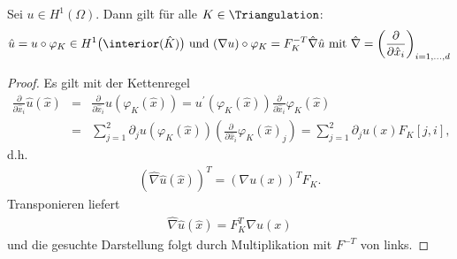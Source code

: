 \begin{Lemma}
    \label{lem:3.11}
    Sei $u \in H^1(\Omega)$. Dann gilt für alle $K \in \Triangulation$:
    \begin{eqnarray*}
        \hat u = u \circ \varphi_K \in H^1\big(\interior(\hat K)\big)
        \text{ und }
        (\nabla u) \circ \varphi_K = F_K^{-T} \hat \nabla \hat u
        \text{ mit }
        \hat \nabla = \left(\frac{\partial}{\partial \hat x_i}\right)
        _{i=1,\dots,d}
    \end{eqnarray*}
\end{Lemma}


\begin{proof}
    Es gilt mit der Kettenregel
    \begin{eqnarray*}
            \frac{\partial}{\partial \hat x_i} \hat u(\hat x)
        &=& \frac{\partial}{\partial \hat x_i} u(\varphi_K(\hat x)) 
        = u^\prime (\varphi_K(\hat x)) \frac{\partial}{\partial \hat x_i}
            \varphi_K(\hat x) \\
        &=& \sum_{j=1}^2 \partial_j u(\varphi_K(\hat x))
            \left(\frac{\partial}{\partial \hat x_i} \varphi_K(\hat x)_j\right)
        = \sum_{j=1}^2 \partial_j u(x) F_K[j,i],
    \end{eqnarray*}
    d.h.
    \begin{eqnarray*}
        \left(\hat \nabla \hat u(\hat x)\right)^T = (\nabla u(x))^T F_K.
    \end{eqnarray*}
    Transponieren liefert
    \begin{eqnarray*}
        \hat \nabla \hat u(\hat x) = F_K^T \nabla u(x)
    \end{eqnarray*}
    und die gesuchte Darstellung folgt durch Multiplikation mit $F^{-T}$ von links.
\end{proof}


